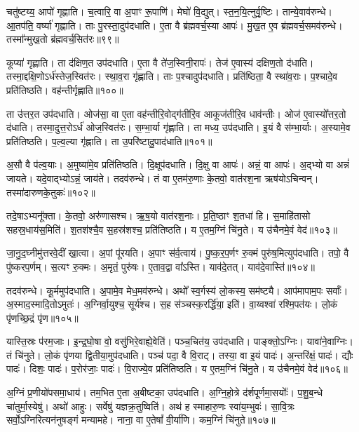 चतु॑ष्टय्य॒ आपो॑ गृह्णाति। च॒त्वारि॒ वा अ॒पाꣳ रू॒पाणि॑। 
मेघो॑ वि॒द्युत्। स्त॒न॒यि॒त्नुर्वृ॒ष्टिः। तान्ये॒वाव॑रुन्धे। 
आ॒तप॑ति॒ वर्ष्या॑ गृह्णाति। ताः पु॒रस्ता॒दुप॑दधाति। 
ए॒ता वै ब्र॑ह्मवर्च॒स्या आपः॑। मु॒ख॒त ए॒व ब्र॑ह्मवर्च॒समव॑रुन्धे। 
तस्मा᳚न्मुख॒तो ब्र॑ह्मवर्च॒सित॑रः॥९९॥


कूप्या॑ गृह्णाति। ता द॑क्षिण॒त उप॑दधाति। 
ए॒ता वै ते॑ज॒स्विनी॒रापः॑। तेज॑ ए॒वास्य॑ दक्षिण॒तो द॑धाति। 
तस्मा॒द्दक्षि॒णो\-ऽर्ध॑स्तेज॒\-स्वित॑रः। स्था॒व॒रा गृ॑ह्णाति। 
ताः प॒श्चादुप॑दधाति। प्रति॑ष्ठिता॒ वै स्था॑व॒राः। 
प॒श्चादे॒व प्रति॑तिष्ठति। वह॑न्तीर्गृह्णाति॥१००॥


ता उ॑त्तर॒त उप॑दधाति। ओज॑सा॒ वा ए॒ता वह॑न्तीरि॒वोद्ग॑तीरि॒व आकूज॑तीरि॒व धाव॑न्तीः। 
ओज॑ ए॒वास्यो᳚त्तर॒तो द॑धाति। तस्मा॒दुत्त॒रोऽर्ध॑ ओज॒स्वित॑रः। 
स॒म्भा॒र्या गृ॑ह्णाति। ता मध्य॒ उप॑दधाति। 
इ॒यं वै स॑म्भा॒र्याः। अ॒स्यामे॒व प्रति॑तिष्ठति। 
प॒ल्व॒ल्या गृ॑ह्णाति। ता उ॒परि॑ष्टादु॒पाद॑धाति॥१०१॥


अ॒सौ वै प॑ल्व॒याः। अ॒मुष्या॑मे॒व प्रति॑तिष्ठति। 
दि॒क्षूप॑दधाति। दि॒क्षु वा आपः॑। 
अन्नं॒ वा आपः॑। अ॒द्भ्यो वा अन्नं॑ जायते। 
यदे॒वाद्भ्योऽन्नं॒ जाय॑ते। तदव॑रुन्धे। 
तं वा ए॒तम॑रु॒णाः के॒तवो॒ वात॑रश॒ना ऋष॑योऽचिन्वन्। 
तस्मा॑दारुणके॒तुकः॑॥१०२॥


तदे॒षाऽभ्यनू᳚क्ता। के॒तवो॒ अरु॑णासश्च। 
ऋ॒ष॒यो वात॑रश॒नाः। प्र॒ति॒ष्ठाꣳ श॒तधा॑ हि। 
स॒माहि॑तासो सहस्र॒धाय॑स॒मिति॑। श॒तश॑श्चै॒व स॒हस्र॑शश्च॒ प्रति॑तिष्ठति। 
य ए॒तम॒ग्निं चि॑नु॒ते। य उ॑चैनमे॒वं वेद॑॥१०३॥\anuvakamend


जा॒नु॒द॒घ्नीमु॑त्तरवे॒दीं खा॒त्वा। अ॒पां पू॑रयति। 
अ॒पाꣳ स॑र्व॒त्वाय॑। पु॒ष्क॒र॒प॒र्णꣳ रु॒क्मं पुरु॑ष॒मित्युप॑दधाति। 
तपो॒ वै पु॑ष्करप॒र्णम्। स॒त्यꣳ रु॒क्मः। 
अ॒मृतं॒ पुरु॑षः। ए॒ताव॒द्वा वा᳚ऽस्ति। 
याव॑दे॒तत्। याव॑दे॒वास्ति॑॥१०४॥


तदव॑रुन्धे। कू॒र्ममुप॑दधाति। 
अ॒पामे॒व मेध॒मव॑रुन्धे। अथो᳚ स्व॒र्गस्य॑ लो॒कस्य॒ सम॑ष्ट्यै। 
आप॑मापाम॒पः सर्वाः᳚। अ॒स्मा\-द॒स्मा\-दि॒तो\-ऽमुतः॑। 
अ॒ग्निर्वा॒युश्च॒ सूर्य॑श्च। स॒ह स॑ञ्चस्क॒रर्द्धि॑या॒ इति॑। 
वा॒य्वश्वा॑ रश्मि॒पत॑यः। लो॒कं पृ॑णच्छि॒द्रं पृ॑ण॥१०५॥


यास्ति॒स्रः प॑रम॒जाः। इ॒न्द्र॒घो॒षा वो॒ वसु॑भिरे॒वाह्ये॒वेति॑। 
पञ्च॒\-चित॑य॒ उप॑दधाति। पाङ्क्तो॒ऽग्निः। 
यावा॑ने॒वाग्निः। तं चि॑नुते। 
लो॒कं पृ॑णया द्वि॒तीया॒मुप॑दधाति। पञ्च॑ पदा॒ वै वि॒राट्। 
तस्या॒ वा इ॒यं पादः॑। अ॒न्तरि॑क्षं॒ पादः॑। द्यौः पादः॑। 
दिशः॒ पादः॑। प॒रोर॑जाः॒ पादः॑। वि॒राज्ये॒व प्रति॑तिष्ठति। 
य ए॒तम॒ग्निं चि॑नु॒ते। य उ॑चैनमे॒वं वेद॑॥१०६॥\anuvakamend


अ॒ग्निं प्र॒णीयो॑पसमा॒धाय॑। तम॒भित ए॒ता अ॒बीष्टका॒ उप॑दधाति। 
अ॒ग्नि॒हो॒त्रे द॑र्शपूर्णमा॒सयोः᳚। प॒शु॒ब॒न्धे चा॑तुर्मा॒स्येषु॑। 
अथो॑ आहुः। सर्वेषु॑ यज्ञक्र॒तुष्विति॑। 
अथ॑ ह स्माहारु॒णः स्वा॑य॒म्भुवः॑। सा॒वि॒त्रः सर्वो॒ऽग्निरित्यन॑नुषङ्गं मन्यामहे। 
नाना॒ वा ए॒तेषां᳚ वी॒र्या॑णि। कम॒ग्निं चि॑नुते॥१०७॥


